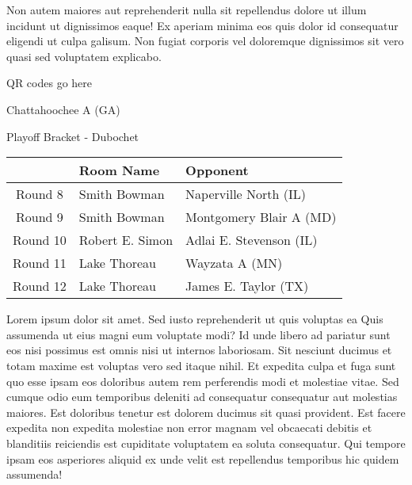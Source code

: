 \documentclass{article}%
\begin{document}
\newline%
Non autem maiores aut reprehenderit nulla sit repellendus dolore ut illum incidunt ut dignissimos eaque! Ex aperiam minima eos quis dolor id consequatur eligendi ut culpa galisum. Non fugiat corporis vel doloremque dignissimos sit vero quasi sed voluptatem explicabo.\newline%
\newline%
%
\vspace*{30pt}%
\begin{center}%
\begin{Huge}%
QR codes go here%
\end{Huge}%
\end{center}%
\newpage%
\begin{center}%
\begin{Huge}%
Chattahoochee A (GA)%
\end{Huge}%
\vspace*{8pt}%
\linebreak%
\begin{Large}%
Playoff Bracket {-} Dubochet%
\end{Large}%
\end{center}%
%
\begin{tabularx}{\textwidth}{|c|Y|Y|}%
\hline%
&Room Name&Opponent\\%
\hline%
Round 8&Smith Bowman&Naperville North (IL)\\%
Round 9&Smith Bowman&Montgomery Blair A (MD)\\%
Round 10&Robert E. Simon&Adlai E. Stevenson (IL)\\%
Round 11&Lake Thoreau&Wayzata A (MN)\\%
Round 12&Lake Thoreau&James E. Taylor (TX)\\%
\hline%
\end{tabularx}%
\vspace*{8pt}%
\linebreak%
\newline%
\newline%
Lorem ipsum dolor sit amet. Sed iusto reprehenderit ut quis voluptas ea Quis assumenda ut eius magni eum voluptate modi? Id unde libero ad pariatur sunt eos nisi possimus est omnis nisi ut internos laboriosam. Sit nesciunt ducimus et totam maxime est voluptas vero sed itaque nihil. Et expedita culpa et fuga sunt quo esse ipsam eos doloribus autem rem perferendis modi et molestiae vitae.\newline%
\newline%
Sed cumque odio eum temporibus deleniti ad consequatur consequatur aut molestias maiores. Est doloribus tenetur est dolorem ducimus sit quasi provident. Est facere expedita non expedita molestiae non error magnam vel obcaecati debitis et blanditiis reiciendis est cupiditate voluptatem ea soluta consequatur. Qui tempore ipsam eos asperiores aliquid ex unde velit est repellendus temporibus hic quidem assumenda!\newline%
\end{document}
